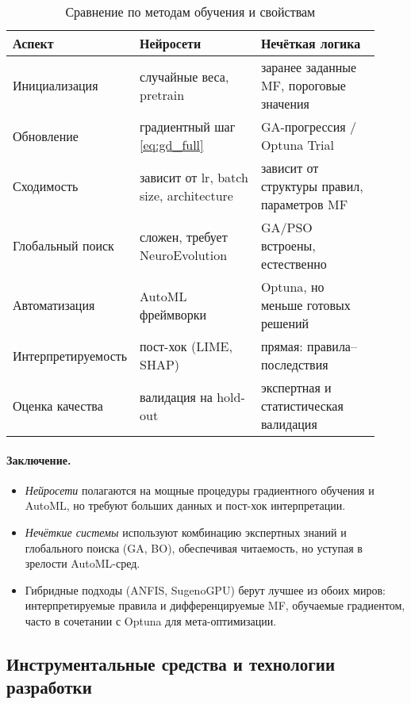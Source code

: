 \begin{table}[h]
\centering\small
\caption{Сравнение по методам обучения и свойствам}
\label{tab:nn_fuzzy_training}
\begin{tabular}{@{}p{0.20\linewidth}p{0.36\linewidth}p{0.36\linewidth}@{}}
\toprule
\textbf{Аспект} & \textbf{Нейросети} & \textbf{Нечёткая логика} \\ \midrule
Инициализация & случайные веса, pretrain & заранее заданные MF, пороговые значения \\[4pt]
Обновление & градиентный шаг \eqref{eq:gd_full} & GA-прогрессия / Optuna Trial \\[4pt]
Сходимость & зависит от lr, batch size, architecture & зависит от структуры правил, параметров MF \\[4pt]
Глобальный поиск & сложен, требует NeuroEvolution & GA/PSO встроены, естественно \\[4pt]
Автоматизация & AutoML фреймворки & Optuna, но меньше готовых решений \\[4pt]
Интерпретируемость  & пост-хок (LIME, SHAP) & прямая: правила–последствия \\[4pt]
Оценка качества & валидация на hold-out & экспертная и статистическая валидация \\ 
\bottomrule
\end{tabular}
\end{table}

\paragraph{Заключение.}
\begin{itemize}
  \item \emph{Нейросети} полагаются на мощные процедуры градиентного обучения и AutoML, но требуют больших данных и пост-хок интерпретации.
  \item \emph{Нечёткие системы} используют комбинацию экспертных знаний и глобального поиска (GA, BO), обеспечивая читаемость, но уступая в зрелости AutoML-сред.
  \item Гибридные подходы (ANFIS, SugenoGPU) берут лучшее из обоих миров: интерпретируемые правила и дифференцируемые MF, обучаемые градиентом, часто в сочетании с Optuna для мета-оптимизации.
\end{itemize}

\subsection{Инструментальные средства и технологии разработки}
\label{subsec:tools}

